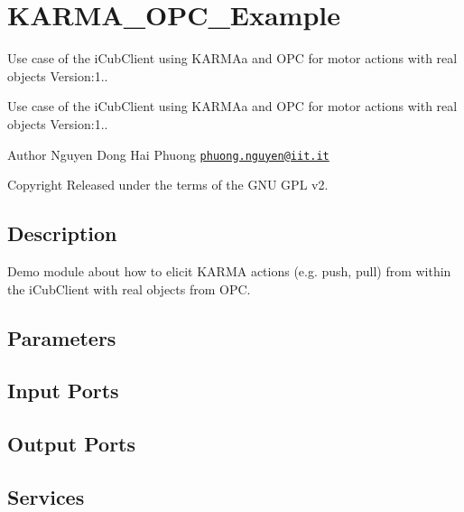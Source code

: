 \hypertarget{group__KARMA__OPC__Example}{}\section{K\+A\+R\+M\+A\+\_\+\+O\+P\+C\+\_\+\+Example}
\label{group__KARMA__OPC__Example}


Use case of the i\+Cub\+Client using K\+A\+R\+M\+Aa and O\+PC for motor actions with real objects Version\+:1..  


Use case of the i\+Cub\+Client using K\+A\+R\+M\+Aa and O\+PC for motor actions with real objects Version\+:1.. 

\begin{DoxyAuthor}{Author}
Nguyen Dong Hai Phuong \href{mailto:phuong.nguyen@iit.it}{\tt phuong.\+nguyen@iit.\+it} ~\newline
 
\end{DoxyAuthor}
\begin{DoxyCopyright}{Copyright}
Released under the terms of the G\+NU G\+PL v2. 
\end{DoxyCopyright}
\hypertarget{group__touchDetector_intro_sec}{}\subsection{Description}\label{group__touchDetector_intro_sec}
Demo module about how to elicit K\+A\+R\+MA actions (e.\+g. push, pull) from within the i\+Cub\+Client with real objects from O\+PC.\hypertarget{group__touchDetector_parameters_sec}{}\subsection{Parameters}\label{group__touchDetector_parameters_sec}
\hypertarget{group__touchDetector_inputports_sec}{}\subsection{Input Ports}\label{group__touchDetector_inputports_sec}
\hypertarget{group__touchDetector_outputports_sec}{}\subsection{Output Ports}\label{group__touchDetector_outputports_sec}
\hypertarget{group__touchDetector_services_sec}{}\subsection{Services}\label{group__touchDetector_services_sec}
